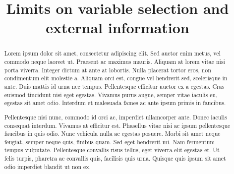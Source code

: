 \documentclass[aos]{imsart}
\theoremstyle{plain}
\begin{document}
\begin{frontmatter}
\title{Limits on variable selection and external information}


\begin{abstract}
Lorem ipsum dolor sit amet, consectetur adipiscing elit. Sed auctor enim metus, vel commodo neque laoreet ut. Praesent ac maximus mauris. Aliquam at lorem vitae nisi porta viverra. Integer dictum at ante at lobortis. Nulla placerat tortor eros, non condimentum elit molestie a. Aliquam orci est, congue vel hendrerit sed, scelerisque in ante. Duis mattis id urna nec tempus. Pellentesque efficitur auctor ex a egestas. Cras euismod tincidunt nisi eget egestas. Vivamus purus augue, semper vitae iaculis eu, egestas sit amet odio. Interdum et malesuada fames ac ante ipsum primis in faucibus.

Pellentesque nisi nunc, commodo id orci ac, imperdiet ullamcorper ante. Donec iaculis consequat interdum. Vivamus at efficitur est. Phasellus vitae nisi ac ipsum pellentesque faucibus in quis odio. Nunc vehicula nulla ac egestas posuere. Morbi sit amet neque feugiat, semper neque quis, finibus quam. Sed eget hendrerit mi. Nam fermentum tempus vulputate. Pellentesque convallis risus tellus, eget viverra elit egestas et. Ut felis turpis, pharetra ac convallis quis, facilisis quis urna. Quisque quis ipsum sit amet odio imperdiet blandit ut non ex.


\end{abstract}
\end{frontmatter}
\end{document}
